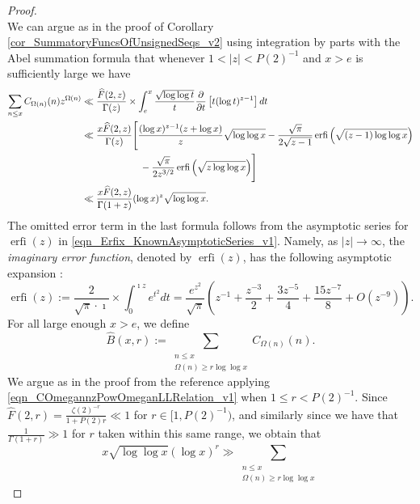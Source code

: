 \documentclass[11pt,reqno,a4letter]{article}
\numberwithin{figure}{section}
\numberwithin{table}{section}
\newcommand{\cf}{\textit{cf.\ }}
\theoremstyle{plain}
\numberwithin{theorem}{section}
\theoremstyle{definition}
\begin{document}
\begin{proof}
\[\]
We can argue as in the proof of Corollary \ref{cor_SummatoryFuncsOfUnsignedSeqs_v2} 
using integration by parts with the Abel summation formula that whenever $1 < |z| < P(2)^{-1}$ 
and $x > e$ is sufficiently large we have 
\begin{align}
\notag
\sum_{n \leq x} C_{\Omega(n)}(n) z^{\Omega(n)} & \ll \frac{\widehat{F}(2, z)}{\Gamma(z)} \times 
     \int_e^{x} \frac{\sqrt{\log\log t}}{t} \frac{\partial}{\partial t}\left[ t (\log t)^{z-1}\right] dt \\ 
\notag 
     & \ll 
     \frac{x \widehat{F}(2, z)}{\Gamma(z)} \Biggl[
     \frac{(\log x)^{z-1}(z+\log x)}{z} \sqrt{\log\log x} - 
     \frac{\sqrt{\pi}}{2\sqrt{z-1}} \operatorname{erfi}\left(\sqrt{(z-1)\log\log x}\right) \\ 
\notag
     & \phantom{\ll\Biggl[\qquad\qquad\ } - 
     \frac{\sqrt{\pi}}{2 z^{3/2}} \operatorname{erfi}\left(\sqrt{z \log\log x}\right) 
     \Biggr] \\ 
\label{eqn_COmegannzPowOmeganLLRelation_v1} 
     & \ll \frac{x \widehat{F}(2, z)}{\Gamma(1+z)} (\log x)^{z} \sqrt{\log\log x}. 
\end{align}
The omitted error term in the last formula follows from the asymptotic series for 
$\operatorname{erfi}(z)$ in \eqref{eqn_Erfix_KnownAsymptoticSeries_v1}. 
Namely, as $|z| \rightarrow \infty$, the \emph{imaginary error function}, denoted by 
$\operatorname{erfi}(z)$, has the following asymptotic expansion 
\cite[\S 7.12]{NISTHB}: 
\begin{equation}
\label{eqn_Erfix_KnownAsymptoticSeries_v1}
\operatorname{erfi}(z) := \frac{2}{\sqrt{\pi} \cdot \imath} \times \int_0^{\imath z} e^{t^2} dt = 
     \frac{e^{z^2}}{\sqrt{\pi}} \left(z^{-1} + \frac{z^{-3}}{2} + 
     \frac{3z^{-5}}{4} + \frac{15 z^{-7}}{8} + O\left(z^{-9}\right)\right). 
\end{equation}
For all large enough $x > e$, we define 
\[
\widehat{B}(x, r) := \sum_{\substack{n \leq x \\ \Omega(n) \geq r\log\log x}} 
     C_{\Omega(n)}(n). 
\]
We argue as in the proof from the reference \cite[\cf Thm.\ 7.20; \S 7.4]{MV} 
applying \eqref{eqn_COmegannzPowOmeganLLRelation_v1} when $1 \leq r < P(2)^{-1}$. 
Since $\widehat{F}(2, r) = \frac{\zeta(2)^{-r}}{1+P(2)r} \ll 1$ for $r \in [1, P(2)^{-1})$, and 
similarly since we have that $\frac{1}{\Gamma(1+r)} \gg 1$ for $r$ taken within this same range, 
we obtain that 
\[
x \sqrt{\log\log x} (\log x)^{r} \gg \sum_{\substack{n \leq x \\ \Omega(n) \geq r\log\log x}} 
\]
\end{proof}
\end{document}
